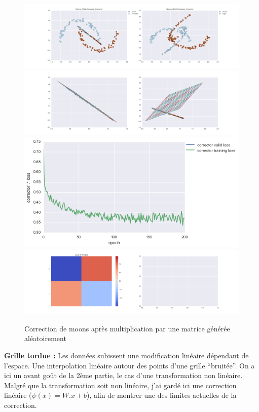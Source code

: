 \begin{figure}[H] %
\centering
\includegraphics[width=\linewidth]{fig/24-05-2016/moons/Moons_RMatClasswise_Corrector-DATA.png}
\includegraphics[width=\linewidth]{fig/24-05-2016/moons/Moons_RMatClasswise_Corrector-GridCheck.png}
\includegraphics[width=0.45\linewidth]{fig/24-05-2016/moons/Moons_RMatClasswise_Corrector-Learning_curve.png}
\includegraphics[width=\linewidth]{fig/24-05-2016/moons/Moons_RMatClasswise_Corrector-W.png}
\caption{Correction de moons après multiplication par une matrice générée aléatoirement}
\label{fig:recap-moons-RMat-classwise}
\end{figure}

{\Large \textbf{Grille tordue :}} Les données subissent une modification linéaire dépendant de l'espace.
Une interpolation linéaire autour des points d'une grille ``bruitée''.
On a ici un avant goût de la 2ème partie, le cas d'une transformation non linéaire.
Malgré que la transformation soit non linéaire, j'ai gardé ici une correction linéaire ($\psi(x) = W.x+b$),
afin de montrer une des limites actuelles de la correction.


